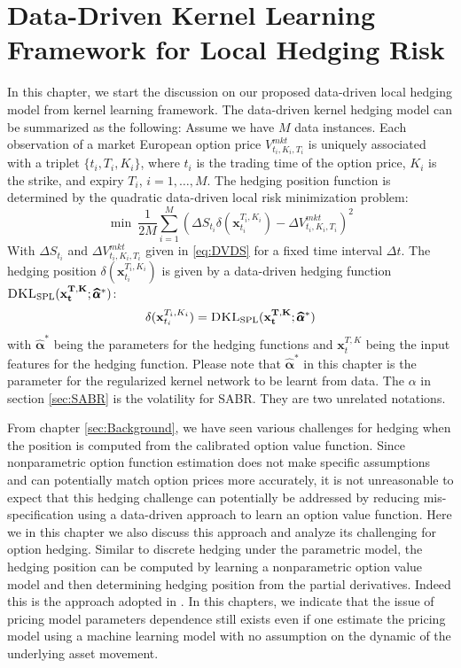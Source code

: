 \documentclass[letterpaper,12pt,titlepage,oneside,final]{book}
\numberwithin{equation}{section}
\theoremstyle{definition}
\newcommand{\vx}{\mathbf{x}}
\newcommand{\DT}{\Delta t}
\newcommand{\valpha}{\pmb{\widehat{\alpha}}}
\newcommand{\DKLs}{\bf\textsc{DKL}_{\text{SPL}}}
\begin{document}
\chapter{Data-Driven Kernel Learning Framework for Local Hedging Risk}
\label{sec:kernel}

In this chapter, we start the discussion on our proposed data-driven local hedging model from kernel learning framework. The data-driven kernel hedging model can be summarized as the following:
Assume we have $M$ data instances.  Each observation of a market European option price  $V^{mkt}_{t_i,K_i,T_i}$ is uniquely associated with a triplet $\{t_i,T_i,K_i\}$, where $t_i$ is the trading time of the option price,  $K_i$ is the strike, and expiry $T_i$, $i=1,\ldots, M$.    The hedging position function is determined by the quadratic data-driven local risk minimization problem:
\[
\min ~\frac{1}{2M}\sum_{i=1}^{M} \left(\Delta S_{t_i} \delta(\vx_{t_i}^{T_i,K_i})- \Delta V^{mkt}_{t_i,K_i,T_i} \right)^2
\]
With $\Delta S_{t_i}$ and $\Delta V^{mkt}_{t_i,K_i,T_i}$ given in  \eqref{eq:DVDS} for a fixed time interval $\DT$.
The hedging position $\delta(\vx_{t_i}^{T_i,K_i})$ is given by a data-driven hedging function $\DKLs(\vx_{t}^{T,K};\valpha^*)$:
\[
	\delta(\vx_{t_i}^{T_i,K_i})=\DKLs(\vx_{t}^{T,K};\valpha^*)
\]
with  $\valpha^*$ being the parameters for the hedging functions and $\vx_{t}^{T,K}$ being the input features for the hedging function. Please note that $\valpha^*$ in this chapter is the parameter for the regularized kernel network to be learnt from data. The $\alpha$ in section \ref{sec:SABR} is the volatility for SABR. They are two unrelated notations.

From chapter \ref{sec:Background}, we have seen various challenges for hedging when the position is computed from the calibrated option value function. Since nonparametric option function estimation does not make specific assumptions and can potentially match option prices more accurately,  it is not unreasonable to  expect that this hedging challenge can potentially be addressed by reducing mis-specification using a data-driven approach to learn an option value function. Here we in this chapter we also discuss this approach and analyze its challenging for option hedging. Similar to discrete hedging under the parametric model, the hedging position can be computed by learning a nonparametric option value model and then determining hedging position from the partial derivatives. Indeed this is the approach adopted in \citep{hutchinson}.
In this chapters, we indicate that the issue of pricing model parameters dependence still exists even if one estimate the pricing model using a machine learning model with no assumption on the dynamic of the underlying asset movement. 
\end{document}
